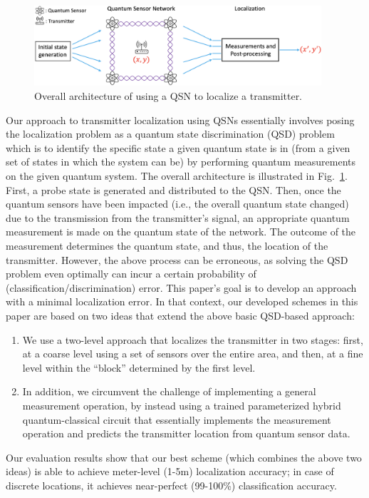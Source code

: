 \begin{figure}[t]
    \centering
    \includegraphics[width=0.95\textwidth]{chapters/qce/figures/overall.png}
    \caption{Overall architecture of using a QSN to localize a transmitter. 
    }
    \label{fig:quantumoverall}
\end{figure}

Our approach to
transmitter localization using QSNs essentially involves posing
the localization problem as a quantum state discrimination
(QSD) problem~\cite{bergou-review-2007} which is to identify the specific state a given
quantum state is in (from a given set of states in which the
system can be) by performing quantum measurements on the
given quantum system. The overall architecture is illustrated in
Fig.~\ref{fig:quantumoverall}. 
First, a probe state is generated and distributed to the
QSN. Then, once the quantum sensors have been impacted
(i.e., the overall quantum state changed) due to the transmission
from the transmitter’s signal, an appropriate quantum measurement 
is made on the quantum state of the network.
The outcome of the measurement determines the quantum
state, and thus, the location of the transmitter. 
However, the
above process can be erroneous, as solving 
the QSD problem even optimally
can incur a certain probability of (classification/discrimination)  error.
This paper’s goal is to develop an approach with a 
minimal localization error. 
In that context, our
developed schemes in this paper are based on two ideas that extend
the above basic QSD-based approach: 
\begin{enumerate}
    \item We use a two-level approach
that localizes the transmitter in two stages: first, at a coarse level
using a set of sensors over the entire area, and then, at a fine level
within the ``block'' determined by the first level. 
\item In addition, we circumvent the challenge of implementing a general
measurement operation, by instead using a trained parameterized 
hybrid quantum-classical circuit that essentially implements the 
measurement operation and predicts the transmitter location from
quantum sensor data.
\end{enumerate}
Our evaluation results show that our best scheme (which combines the above two ideas) is able to achieve meter-level (1-5m) localization accuracy; in case of discrete locations, it achieves near-perfect (99-100\%) classification accuracy. 

